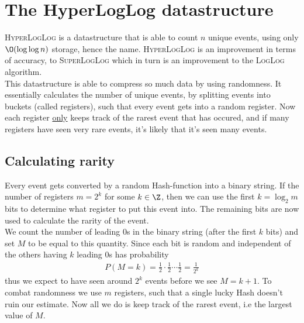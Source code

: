 \section{The HyperLogLog datastructure}
\textsc{HyperLogLog} is a datastructure that is able to count $n$ unique events, using only $\O(\log\log n)$ storage, hence the name. \textsc{HyperLogLog} is an improvement in terms of accuracy, to \textsc{SuperLogLog} which in turn is an improvement to the \textsc{LogLog} algorithm.
\\
This datastructure is able to compress so much data by using randomness. It essentially calculates the number of unique events, by splitting events into buckets (called registers), such that every event gets into a random register. Now each register \underline{only} keeps track of the rarest event that has occured, and if many registers have seen very rare events, it's likely that it's seen many events. 

\subsection{Calculating rarity}
Every event gets converted by a random Hash-function into a binary string. If the number of registers $m=2^k$ for some $k\in\Z$, then we can use the first $k=\log_2 m$ bits to determine what register to put this event into. The remaining bits are now used to calculate the rarity of the event.
\\
We count the number of leading 0s in the binary string (after the first $k$ bits) and set $M$ to be equal to this quantity. Since each bit is random and independent of the others having $k$ leading 0s has probability
\begin{equation*}
    \begin{split}
        P(M=k)=\frac{1}{2}\cdot \frac{1}{2}\cdots \frac{1}{2}=\frac{1}{2^k}
    \end{split}
\end{equation*}
thus we expect to have seen around $2^k$ events before we see $M=k+1$. To combat randomness we use $m$ registers, such that a single lucky Hash doesn't ruin our estimate. Now all we do is keep track of the rarest event, i.e the largest value of $M$.



